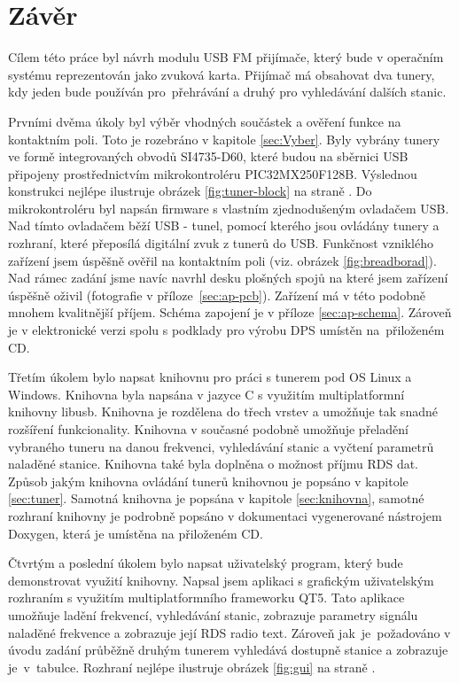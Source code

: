 \section{Závěr}
\label{sec:Conclusion}


Cílem této práce byl návrh modulu USB FM přijímače, který bude v operačním systému reprezentován jako zvuková karta. Přijímač má obsahovat dva tunery, kdy jeden bude používán pro~přehrávání a druhý pro vyhledávání dalších stanic. 

Prvními dvěma úkoly byl výběr vhodných součástek a ověření funkce na kontaktním poli. Toto je rozebráno v kapitole \ref{sec:Vyber}. Byly vybrány tunery ve formě integrovaných obvodů SI4735-D60, které budou na sběrnici USB připojeny prostřednictvím mikrokontroléru PIC32MX250F128B. Výslednou konstrukci nejlépe ilustruje obrázek \ref{fig:tuner-block} na straně \pageref{fig:tuner-block}. Do mikrokontroléru byl napsán firmware s vlastním zjednodušeným ovladačem USB. Nad tímto ovladačem běží USB - \iic tunel, pomocí kterého jsou ovládány tunery a rozhraní, které přeposílá digitální zvuk z tunerů do USB. Funkčnost vzniklého zařízení jsem úspěšně ověřil na kontaktním poli (viz. obrázek \ref{fig:breadborad}). Nad rámec zadání jsme navíc navrhl  desku plošných spojů na které jsem zařízení úspěšně oživil (fotografie v příloze~\ref{sec:ap-pcb}). Zařízení má v této podobně mnohem kvalitnější příjem. Schéma zapojení je v příloze \ref{sec:ap-schema}. Zároveň je v elektronické verzi spolu s podklady pro výrobu DPS umístěn na~přiloženém CD.

Třetím úkolem bylo napsat knihovnu pro práci s tunerem pod OS Linux a Windows. Knihovna byla napsána v jazyce C s využitím multiplatformní knihovny libusb. Knihovna je rozdělena do třech vrstev a umožňuje tak snadné rozšíření funkcionality. Knihovna v současné podobně umožňuje přeladění vybraného tuneru na danou frekvenci, vyhledávání stanic a vyčtení parametrů naladěné stanice. Knihovna také byla doplněna o možnost příjmu RDS dat. Způsob jakým knihovna ovládání tunerů knihovnou je popsáno v kapitole \ref{sec:tuner}. Samotná knihovna je popsána v kapitole \ref{sec:knihovna}, samotné rozhraní knihovny je podrobně popsáno v dokumentaci vygenerované nástrojem Doxygen, která je umístěna na přiloženém CD.

Čtvrtým a poslední úkolem bylo napsat uživatelský program, který bude demonstrovat využití knihovny. Napsal jsem aplikaci s grafickým uživatelským rozhraním s využitím multiplatformního frameworku QT5. Tato aplikace umožňuje ladění frekvencí, vyhledávání stanic, zobrazuje parametry signálu naladěné frekvence a zobrazuje její RDS radio text. Zároveň jak~je~požadováno v úvodu zadání průběžně druhým tunerem vyhledává dostupně stanice a zobrazuje je~v~tabulce. Rozhraní nejlépe ilustruje obrázek \ref{fig:gui} na straně \pageref{fig:gui}.

